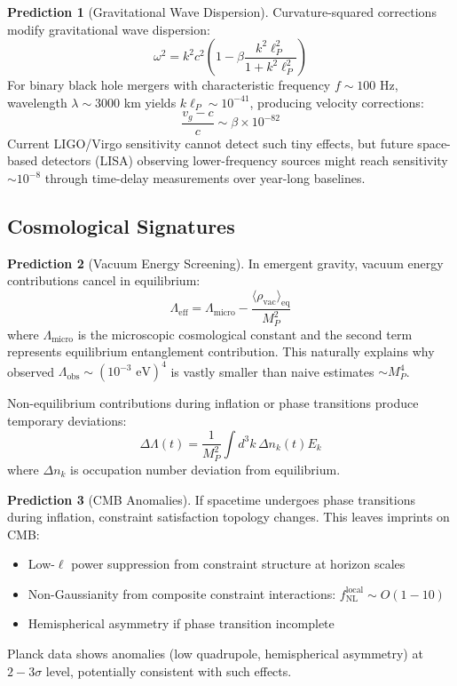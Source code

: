 \documentclass[11pt,a4paper]{article}
\theoremstyle{remark}
\theoremstyle{definition}
\newtheorem{prediction}{Prediction}[section]
\begin{document}
\begin{prediction}[Gravitational Wave Dispersion]
Curvature-squared corrections modify gravitational wave dispersion:
\begin{equation}
\omega^2 = k^2 c^2\left(1 - \beta \frac{k^2 \ell_P^2}{1 + k^2 \ell_P^2}\right)
\end{equation}
For binary black hole mergers with characteristic frequency $f \sim 100$ Hz, wavelength $\lambda \sim 3000$ km yields $k \ell_P \sim 10^{-41}$, producing velocity corrections:
\begin{equation}
\frac{v_g - c}{c} \sim \beta \times 10^{-82}
\end{equation}
Current LIGO/Virgo sensitivity cannot detect such tiny effects, but future space-based detectors (LISA) observing lower-frequency sources might reach sensitivity $\sim 10^{-8}$ through time-delay measurements over year-long baselines.
\end{prediction}

\subsection{Cosmological Signatures}

\begin{prediction}[Vacuum Energy Screening]
In emergent gravity, vacuum energy contributions cancel in equilibrium:
\begin{equation}
\Lambda_{\text{eff}} = \Lambda_{\text{micro}} - \frac{\langle \rho_{\text{vac}} \rangle_{\text{eq}}}{M_P^2}
\end{equation}
where $\Lambda_{\text{micro}}$ is the microscopic cosmological constant and the second term represents equilibrium entanglement contribution. This naturally explains why observed $\Lambda_{\text{obs}} \sim (10^{-3} \text{ eV})^4$ is vastly smaller than naive estimates $\sim M_P^4$.

Non-equilibrium contributions during inflation or phase transitions produce temporary deviations:
\begin{equation}
\Delta\Lambda(t) = \frac{1}{M_P^2}\int d^3k \, \Delta n_k(t) E_k
\end{equation}
where $\Delta n_k$ is occupation number deviation from equilibrium.
\end{prediction}

\begin{prediction}[CMB Anomalies]
If spacetime undergoes phase transitions during inflation, constraint satisfaction topology changes. This leaves imprints on CMB:
\begin{itemize}
\item Low-$\ell$ power suppression from constraint structure at horizon scales
\item Non-Gaussianity from composite constraint interactions: $f_{\text{NL}}^{\text{local}} \sim O(1-10)$
\item Hemispherical asymmetry if phase transition incomplete
\end{itemize}
Planck data shows anomalies (low quadrupole, hemispherical asymmetry) at $2-3\sigma$ level, potentially consistent with such effects.
\end{prediction}
\end{document}
